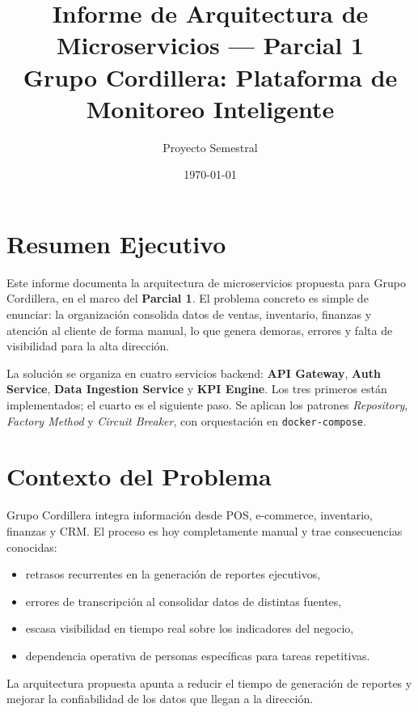 \documentclass[12pt,a4paper]{article}
\title{\textbf{Informe de Arquitectura de Microservicios --- Parcial 1}\\[4pt]
{\large Grupo Cordillera: Plataforma de Monitoreo Inteligente}}
\author{Proyecto Semestral}
\date{\today}
\begin{document}
\maketitle
\thispagestyle{empty}
\clearpage
\tableofcontents
\clearpage

\section{Resumen Ejecutivo}

Este informe documenta la arquitectura de microservicios propuesta para Grupo Cordillera, en el marco del \textbf{Parcial 1}. El problema concreto es simple de enunciar: la organización consolida datos de ventas, inventario, finanzas y atención al cliente de forma manual, lo que genera demoras, errores y falta de visibilidad para la alta dirección.

La solución se organiza en cuatro servicios backend: \textbf{API Gateway}, \textbf{Auth Service}, \textbf{Data Ingestion Service} y \textbf{KPI Engine}. Los tres primeros están implementados; el cuarto es el siguiente paso. Se aplican los patrones \textit{Repository}, \textit{Factory Method} y \textit{Circuit Breaker}, con orquestación en \texttt{docker-compose}.

\section{Contexto del Problema}

Grupo Cordillera integra información desde POS, e-commerce, inventario, finanzas y CRM. El proceso es hoy completamente manual y trae consecuencias conocidas:
\begin{itemize}[leftmargin=1.2cm]
  \item retrasos recurrentes en la generación de reportes ejecutivos,
  \item errores de transcripción al consolidar datos de distintas fuentes,
  \item escasa visibilidad en tiempo real sobre los indicadores del negocio,
  \item dependencia operativa de personas específicas para tareas repetitivas.
\end{itemize}

La arquitectura propuesta apunta a reducir el tiempo de generación de reportes y mejorar la confiabilidad de los datos que llegan a la dirección.
\end{document}
